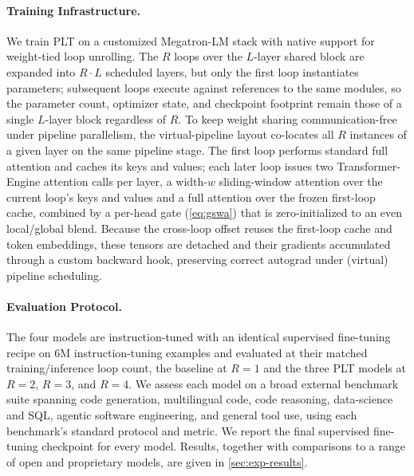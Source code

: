 \documentclass{llmxive}
\providecommand{\loopcount}{R}
\begin{document}
\paragraph{Training Infrastructure.}
\label{sec:exp-infra}
We train PLT on a customized Megatron-LM stack with native support for
weight-tied loop unrolling.
The $\loopcount$ loops over the $L$-layer shared block are expanded into
$\loopcount\cdot L$ scheduled layers, but only the first loop instantiates
parameters; subsequent loops execute against references to the same modules, so
the parameter count, optimizer state, and checkpoint footprint remain those of a
single $L$-layer block regardless of $\loopcount$.
To keep weight sharing communication-free under pipeline parallelism, the
virtual-pipeline layout co-locates all $\loopcount$ instances of a given layer on
the same pipeline stage.
The first loop performs standard full attention and caches its keys and values;
each later loop issues two Transformer-Engine attention calls per layer, a
width-$w$ sliding-window attention over the current loop's keys and values and a
full attention over the frozen first-loop cache, combined by a per-head gate
(\autoref{eq:gswa}) that is zero-initialized to an even local/global blend.
Because the cross-loop offset reuses the first-loop cache and token embeddings,
these tensors are detached and their gradients accumulated through a custom
backward hook, preserving correct autograd under (virtual) pipeline scheduling.

\paragraph{Evaluation Protocol.}
\label{sec:exp-eval}

The four models are instruction-tuned with an identical supervised
fine-tuning recipe on 6M instruction-tuning examples and evaluated at their
matched training/inference loop
count, the baseline at $\loopcount = 1$ and the three PLT models at
$\loopcount = 2$, $\loopcount = 3$, and $\loopcount = 4$.
We assess each model on a broad external benchmark suite spanning code
generation, multilingual code, code reasoning, data-science and SQL, agentic
software engineering, and general tool use, using each benchmark's standard
protocol and metric.
We report the final supervised fine-tuning checkpoint for every model. Results,
together with comparisons to a range of open and proprietary models, are given
in \autoref{sec:exp-results}.
\end{document}
